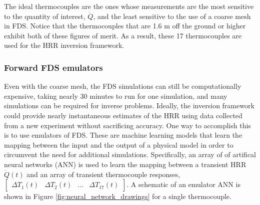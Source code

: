 \documentclass{article}
\begin{document}
The ideal thermocouples are the ones whose measurements are the most sensitive to the quantity of interest, $\dot{Q}$, and the least sensitive to the use of a coarse mesh in FDS. Notice that the thermocouples that are 1.6 m off the ground or higher exhibit both of these figures of merit. As a result, these 17 thermocouples are used for the HRR inversion framework. 


\clearpage
\subsubsection{Forward FDS emulators}

Even with the coarse mesh, the FDS simulations can still be computationally expensive, taking nearly 30 minutes to run for one simulation, and many simulations can be required for inverse problems. Ideally, the inversion framework could provide nearly instantaneous estimates of the HRR using data collected from a new experiment without sacrificing accuracy. One way to accomplish this is to use emulators of FDS. These are machine learning models that learn the mapping between the input and the output of a physical model in order to circumvent the need for additional simulations. Specifically, an array of of artifical neural networks (ANN) is used to learn the mapping between a transient HRR $\dot{Q}(t)$ and an array of transient thermocouple responses, $\begin{bmatrix} \Delta T_1(t) & \Delta T_2(t) & \ldots & \Delta T_{17}(t) \end{bmatrix}$. A schematic of an emulator ANN is shown in Figure \ref{fig:neural_network_drawings} for a single thermocouple. 
\end{document}
